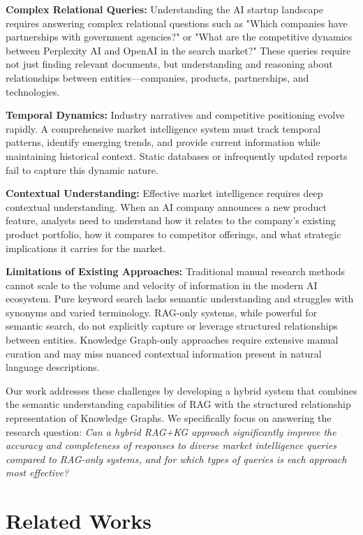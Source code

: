 \documentclass[11pt,twocolumn]{article}
\begin{document}
\textbf{Complex Relational Queries:} Understanding the AI startup landscape requires answering complex relational questions such as "Which companies have partnerships with government agencies?" or "What are the competitive dynamics between Perplexity AI and OpenAI in the search market?" These queries require not just finding relevant documents, but understanding and reasoning about relationships between entities—companies, products, partnerships, and technologies.

\textbf{Temporal Dynamics:} Industry narratives and competitive positioning evolve rapidly. A comprehensive market intelligence system must track temporal patterns, identify emerging trends, and provide current information while maintaining historical context. Static databases or infrequently updated reports fail to capture this dynamic nature.

\textbf{Contextual Understanding:} Effective market intelligence requires deep contextual understanding. When an AI company announces a new product feature, analysts need to understand how it relates to the company's existing product portfolio, how it compares to competitor offerings, and what strategic implications it carries for the market.

\textbf{Limitations of Existing Approaches:} Traditional manual research methods cannot scale to the volume and velocity of information in the modern AI ecosystem. Pure keyword search lacks semantic understanding and struggles with synonyms and varied terminology. RAG-only systems, while powerful for semantic search, do not explicitly capture or leverage structured relationships between entities. Knowledge Graph-only approaches require extensive manual curation and may miss nuanced contextual information present in natural language descriptions.

Our work addresses these challenges by developing a hybrid system that combines the semantic understanding capabilities of RAG with the structured relationship representation of Knowledge Graphs. We specifically focus on answering the research question: \textit{Can a hybrid RAG+KG approach significantly improve the accuracy and completeness of responses to diverse market intelligence queries compared to RAG-only systems, and for which types of queries is each approach most effective?}

\section{Related Works}
\end{document}
